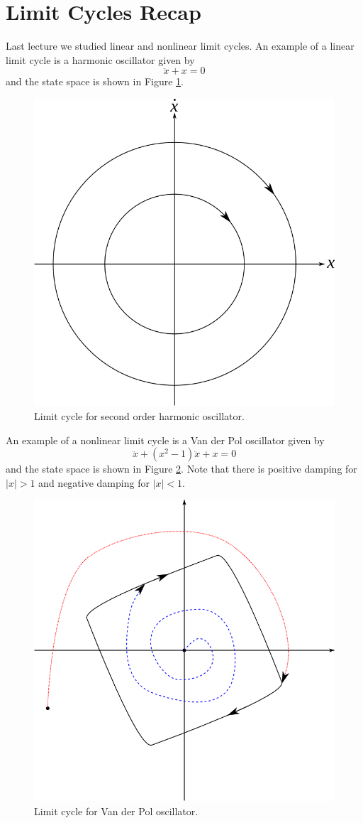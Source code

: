 
\mainmatter
\setcounter{page}{1}

\lectureseries[\course]{\course}

\date{January 7, 2010}

\setaddress

\setcounter{lecture}{1}
\setcounter{chapter}{1}

\label{lec:mae281a_lec02}

\section{Limit Cycles Recap}
Last lecture we studied linear and nonlinear limit cycles. An example of a linear limit cycle is a  harmonic oscillator given by
$$\ddot{x} + x = 0$$
and the state space is shown in Figure \ref{fig:02secondorder}.

\begin{figure}[ht!]
	\centering
	\includegraphics[width=.4\textwidth]{images/01secondorder}
	\caption{Limit cycle for second order harmonic oscillator.}
	\label{fig:02secondorder}
\end{figure}

An example of a nonlinear limit cycle is a Van der Pol oscillator given by
$$\ddot{x} + (x^2-1)\ddot{x} + x = 0$$
and the state space is shown in Figure \ref{fig:02vdplc}. Note that there is positive damping for $|x|>1$ and negative damping for $|x|<1$.

\begin{figure}[ht!]
	\centering
	\includegraphics[width=.4\textwidth]{images/02vdplc}
	\caption{Limit cycle for Van der Pol oscillator.}
	\label{fig:02vdplc}
\end{figure}

